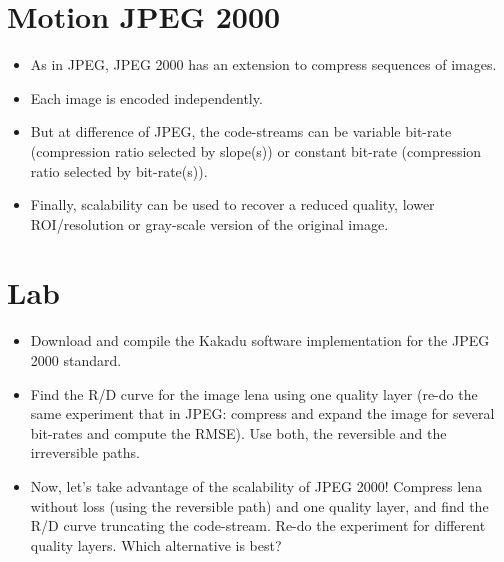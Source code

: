 \section{Motion JPEG 2000}
\begin{itemize}
\item As in JPEG, JPEG 2000 has an extension \cite{j2k-part3} to
  compress sequences of images.
\item Each image is encoded independently.
\item But at difference of JPEG, the code-streams can be variable
  bit-rate (compression ratio selected by slope(s)) or constant
  bit-rate (compression ratio selected by bit-rate(s)).
\item Finally, scalability can be used to recover a reduced quality,
  lower ROI/resolution or gray-scale version of the original image. 
\end{itemize}
\begin{center}
\end{center}

\section*{Lab}
\begin{itemize}
\item Download and compile the Kakadu software implementation for the
  JPEG 2000 standard.
\item Find the R/D curve for the image lena using one quality layer
  (re-do the same experiment that in JPEG: compress and expand
  the image for several bit-rates and compute the RMSE). Use both, the
  reversible and the irreversible paths.
\item Now, let's take advantage of the scalability of JPEG 2000!
  Compress lena without loss (using the reversible path) and one
  quality layer, and find the R/D curve truncating the
  code-stream. Re-do the experiment for different quality
  layers. Which alternative is best?
\end{itemize}

